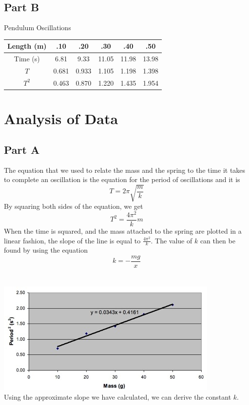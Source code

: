 \documentclass[titlepage]{article}
\begin{document}
\subsection{Part B}\label{sub:part_b}

Pendulum Oscillations
\begin{tabular}{cccccc}
\hline
Length (m) & .10 & .20 & .30 & .40 & .50\\
\hline
Time (s) & 6.81 & 9.33 & 11.05 & 11.98 & 13.98\\
\hline
$T$ & 0.681 & 0.933 & 1.105 & 1.198 & 1.398\\
\hline
$T^2$ & 0.463 & 0.870 & 1.220 & 1.435 & 1.954\\
\hline
\end{tabular}


\section{Analysis of Data}\label{sec:analysis_of_data}

\subsection{Part A}\label{sub:part_a}
The equation that we used to relate the mass and the spring to the time it takes to complete an oscillation is the equation for the period of oscillations and it is
\begin{equation}
	T = 2 \pi \sqrt{\frac{m}{k}}
\end{equation}
By squaring both sides of the equation, we get
\begin{equation}
	T^2 = \frac{4 \pi^2}{k} m
\end{equation}
When the time is squared, and the mass attached to the spring are plotted in a linear fashion, the slope of the line is equal to $\frac{4 \pi^2}{k}$. The value of $k$ can then be found by using the equation
\begin{equation}
	k = -\frac{mg}{x}
\end{equation}
\\
\\
\includegraphics{graphA.jpg}
\\
Using the approximate slope we have calculated, we can derive the constant $k$.
\end{document}
